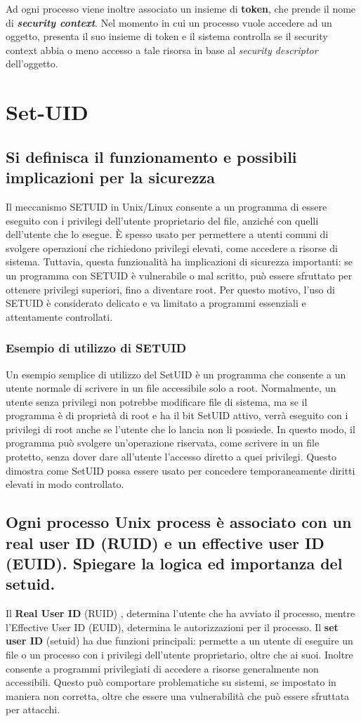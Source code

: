 \documentclass{report}
\begin{document}
\noindent Ad ogni processo viene inoltre associato un insieme di \textbf{token}, che prende il nome di 
\textbf{\textit{security context}}. Nel momento in cui un processo vuole accedere ad un oggetto, presenta 
il suo insieme di token e il sistema controlla se il security context abbia o meno accesso a tale risorsa 
in base al \textit{security descriptor} dell'oggetto.



\chapter{Set-UID}
\section{Si definisca il funzionamento e possibili implicazioni per la sicurezza}
Il meccanismo SETUID in Unix/Linux consente a un programma di essere eseguito con i privilegi dell’utente proprietario del file, anziché con quelli dell’utente che lo esegue. È spesso usato per permettere a utenti comuni di svolgere operazioni che richiedono privilegi elevati, come accedere a risorse di sistema. Tuttavia, questa funzionalità ha implicazioni di sicurezza importanti: se un programma con SETUID è vulnerabile o mal scritto, può essere sfruttato per ottenere privilegi superiori, fino a diventare root. Per questo motivo, l’uso di SETUID è considerato delicato e va limitato a programmi essenziali e attentamente controllati.

\subsection{Esempio di utilizzo di SETUID}
Un esempio semplice di utilizzo del SetUID è un programma che consente a un utente normale di scrivere in un file accessibile solo a root. Normalmente, un utente senza privilegi non potrebbe modificare file di sistema, ma se il programma è di proprietà di root e ha il bit SetUID attivo, verrà eseguito con i privilegi di root anche se l’utente che lo lancia non li possiede. In questo modo, il programma può svolgere un’operazione riservata, come scrivere in un file protetto, 
senza dover dare all’utente l’accesso diretto a quei privilegi. Questo dimostra come SetUID possa essere usato per concedere temporaneamente diritti elevati in modo controllato.

\section{Ogni processo Unix process è associato con un real user ID (RUID) e un effective user ID (EUID). Spiegare la logica ed importanza del setuid.}
Il \textbf{Real User ID} (RUID) , determina l'utente che ha avviato il processo, mentre l'Effective User ID (EUID), determina le autorizzazioni per il processo.
Il \textbf{set user ID} (setuid) ha due funzioni principali: permette a un utente di eseguire un file o un processo con i privilegi dell'utente proprietario, oltre che ai suoi. Inoltre consente a programmi privilegiati di accedere a risorse generalmente non accessibili.
Questo può comportare problematiche su sistemi, se impostato in maniera non corretta, oltre che essere una vulnerabilità che può essere sfruttata per attacchi.
\end{document}
